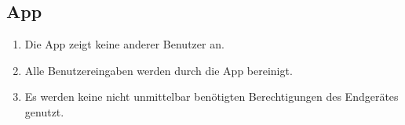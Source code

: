 \subsection{App}

\begin{enumerate}
    \item Die App zeigt keine anderer Benutzer an.
    \item Alle Benutzereingaben werden durch die App bereinigt.
    \item Es werden keine nicht unmittelbar benötigten Berechtigungen des Endgerätes genutzt.
\end{enumerate}